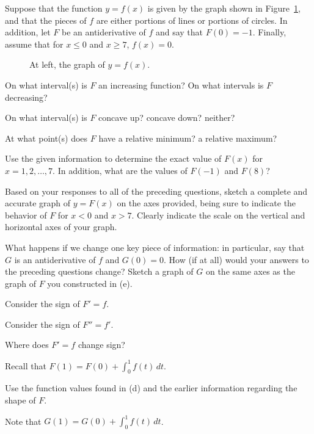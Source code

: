 \begin{activity} \label{A:5.1.1}  Suppose that the function $y = f(x)$ is given by the graph shown in Figure~\ref{F:5.1.Act1}, and that the pieces of $f$ are either portions of lines or portions of circles.  In addition, let $F$ be an antiderivative of $f$ and say that $F(0) = -1$.  Finally, assume that for $x \le 0$ and $x \ge 7$, $f(x) = 0$.
\begin{figure}[h]
\begin{center}
\end{center}
\caption{At left, the graph of $y = f(x)$.} \label{F:5.1.Act1}
\end{figure}
\ba
	\item On what interval(s) is $F$ an increasing function?  On what intervals is $F$ decreasing?
	\item On what interval(s) is $F$ concave up?  concave down? neither?
	\item At what point(s) does $F$ have a relative minimum?  a relative maximum?
	\item Use the given information to determine the exact value of $F(x)$ for $x = 1, 2, \ldots, 7$.  In addition, what are the values of $F(-1)$ and $F(8)$?
	\item Based on your responses to all of the preceding questions, sketch a complete and accurate graph of $y = F(x)$ on the axes provided, being sure to indicate the behavior of $F$ for $x < 0$ and $x > 7$.  Clearly indicate the scale on the vertical and horizontal axes of your graph.
	\item What happens if we change one key piece of information:  in particular, say that $G$ is an antiderivative of $f$ and $G(0) = 0$.  How (if at all) would your answers to the preceding questions change?  Sketch a graph of $G$ on the same axes as the graph of $F$ you constructed in (e).
\ea
\end{activity}
\begin{smallhint}
\ba
	\item Consider the sign of $F' = f$.
	\item Consider the sign of $F'' = f'$.
	\item Where does $F' = f$ change sign?
	\item Recall that $F(1) = F(0) + \int_0^1 f(t) \, dt$.
	\item Use the function values found in (d) and the earlier information regarding the shape of $F$.
	\item Note that $G(1) = G(0) + \int_0^1 f(t) \, dt$. 
\ea
\end{smallhint}
